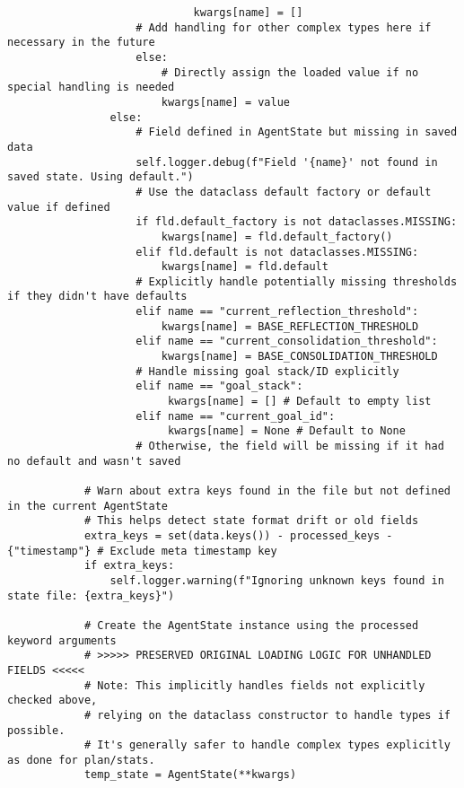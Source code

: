 \documentclass[12pt,a4paper]{article}
\begin{document}
\begin{pageablecode}
\begin{verbatim}
                             kwargs[name] = []
                    # Add handling for other complex types here if necessary in the future
                    else:
                        # Directly assign the loaded value if no special handling is needed
                        kwargs[name] = value
                else:
                    # Field defined in AgentState but missing in saved data
                    self.logger.debug(f"Field '{name}' not found in saved state. Using default.")
                    # Use the dataclass default factory or default value if defined
                    if fld.default_factory is not dataclasses.MISSING:
                        kwargs[name] = fld.default_factory()
                    elif fld.default is not dataclasses.MISSING:
                        kwargs[name] = fld.default
                    # Explicitly handle potentially missing thresholds if they didn't have defaults
                    elif name == "current_reflection_threshold":
                        kwargs[name] = BASE_REFLECTION_THRESHOLD
                    elif name == "current_consolidation_threshold":
                        kwargs[name] = BASE_CONSOLIDATION_THRESHOLD
                    # Handle missing goal stack/ID explicitly
                    elif name == "goal_stack":
                         kwargs[name] = [] # Default to empty list
                    elif name == "current_goal_id":
                         kwargs[name] = None # Default to None
                    # Otherwise, the field will be missing if it had no default and wasn't saved

            # Warn about extra keys found in the file but not defined in the current AgentState
            # This helps detect state format drift or old fields
            extra_keys = set(data.keys()) - processed_keys - {"timestamp"} # Exclude meta timestamp key
            if extra_keys:
                self.logger.warning(f"Ignoring unknown keys found in state file: {extra_keys}")

            # Create the AgentState instance using the processed keyword arguments
            # >>>>> PRESERVED ORIGINAL LOADING LOGIC FOR UNHANDLED FIELDS <<<<<
            # Note: This implicitly handles fields not explicitly checked above,
            # relying on the dataclass constructor to handle types if possible.
            # It's generally safer to handle complex types explicitly as done for plan/stats.
            temp_state = AgentState(**kwargs)


\end{verbatim}
\end{pageablecode}
\end{document}
